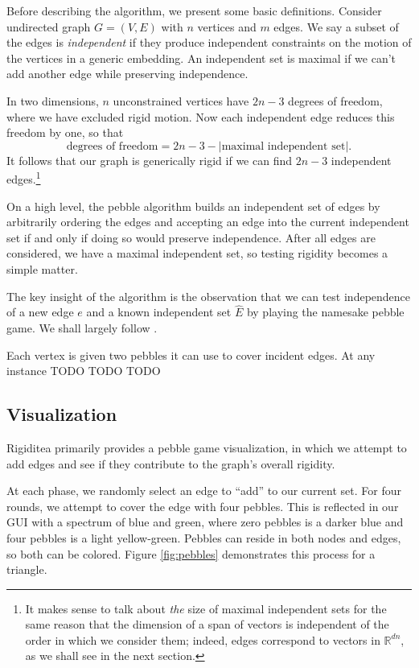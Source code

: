 \documentclass[aps,prd,final,twocolumn,letterpaper,nofootinbib]{revtex4-1}
\newcommand\RR{\mathbb{R}}
\newcommand{\abs}[1]{|#1|}
\begin{document}
Before describing the algorithm,
we present some basic definitions.
Consider undirected graph $G = (V, E)$
with $n$ vertices and $m$ edges.
We say a subset of the edges is \emph{independent}
if they produce independent constraints on the motion of the vertices
in a generic embedding.
An independent set is maximal if we can't add another edge
while preserving independence.

In two dimensions, $n$ unconstrained vertices have $2n-3$ degrees of freedom,
where we have excluded rigid motion.
Now each independent edge reduces this freedom by one,
so that
\[
    \text{degrees of freedom} = 2n - 3 - \abs{\text{maximal independent set}}.
\]
It follows that our graph is generically rigid
if we can find $2n-3$ independent edges.\footnote{It makes sense
to talk about \emph{the} size 
of maximal independent sets
for the same reason that the dimension of a span of vectors
is independent of the order in which we consider them;
indeed, edges correspond to vectors in $\RR^{dn}$,
as we shall see in the next section.}

On a high level,
the pebble algorithm builds an independent set of edges
by arbitrarily ordering the edges
and accepting an edge into the current independent set
if and only if doing so would preserve independence.
After all edges are considered,
we have a maximal independent set,
so testing rigidity becomes a simple matter.

The key insight of the algorithm
is the observation that we can test independence of a new edge $e$
and a known independent set $\hat E$
by playing the namesake pebble game.
We shall largely follow \cite{stjohnapplet}.

Each vertex is given two pebbles it can use to cover incident edges.
At any instance TODO TODO TODO


\subsection{Visualization}


Rigiditea primarily provides a pebble game visualization,
in which we attempt to add edges and see if they contribute
to the graph's overall rigidity.

At each phase, we randomly select an edge to ``add'' to our current set.
For four rounds, we attempt to cover the edge with four pebbles.
This is reflected in our GUI with a spectrum of blue and green,
where zero pebbles is a darker blue and four pebbles is a light yellow-green.
Pebbles can reside in both nodes and edges,
so both can be colored.
Figure \ref{fig:pebbles} demonstrates this process
for a triangle.
\end{document}
